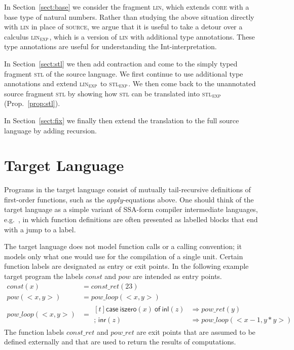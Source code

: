 \documentclass{LMCS}
\theoremstyle{definition}
\theoremstyle{plain}
\newcommand{\kw}[1]{\mathsf{#1}}
\newcommand{\Capply}{\textit{apply}}
\newcommand{\tmcase}[5]{\!\begin{aligned}[t]
  \kw{case}\ #1\ \kw{of}\ 
     \kw{inl}(#2) &\Rightarrow #3 \\[-.27em]
    ;\, \kw{inr}(#4) &\Rightarrow #5    
  \end{aligned}
  }
\newcommand{\linexp}{\textsc{lin}$_\textsc{exp}$\xspace}
\newcommand{\stlexp}{\textsc{stl}$_\textsc{exp}$\xspace}
\begin{document}
In Section~\ref{sect:base} we consider the fragment \textsc{lin}, which
extends \textsc{core} with a base type of natural numbers. 
Rather than studying the above situation directly with \textsc{lin} in
place of \textsc{source}, we argue that it is useful to take a detour
over a calculus \linexp, which is a version of \textsc{lin} with additional 
type annotations. 
These type annotations are useful for understanding the Int-interpretation.

In Section~\ref{sect:stl} we then add contraction and come to
the simply typed fragment \textsc{stl} of the source language.
We first continue to use additional type annotations and extend 
\linexp to \stlexp. We then come back to the unannotated source
fragment \textsc{stl} by showing how \textsc{stl} can be translated
into \stlexp (Prop.~\ref{prop:stl}). 

In Section~\ref{sect:fix} we finally then extend the translation to the
full source language by adding recursion.

\section{Target Language}
\label{sect:target}

Programs in the target language consist of mutually tail-recursive definitions
of first-order functions, such as the $\Capply$-equations above. 
One should think of the target language as a simple variant
of SSA-form compiler intermediate 
languages, e.g.~\cite{DBLP:conf/esop/CejtinJW00}, in which
function definitions are often presented as labelled blocks that
end with a jump to a label.

The target language does not model function calls or a calling
convention; 
it models only what one would use for the compilation of a
single unit.
Certain function labels are designated as entry or exit
points. In the following example target program
the labels $\textit{const}$ and $\textit{pow}$ are
intended as entry points.
\[
\begin{aligned}
  {\textit{const}}(x) &= {\textit{const\_ret}}(23) \\
  {\textit{pow}}(<x,y>) &= {\textit{pow\_loop}}(<x,y>) \\
  {\textit{pow\_loop}}(<x,y>) &= \tmcase {\kw{iszero}(x)} {z} {{\textit{pow\_ret}}(y)} {z} {{\textit{pow\_loop}}(<x-1,y*y>)}
\end{aligned}
\]
The function labels
$\textit{const\_ret}$ and $\textit{pow\_ret}$ are exit points that
are assumed to be defined externally and that are used to return the 
results of computations. 
\end{document}
